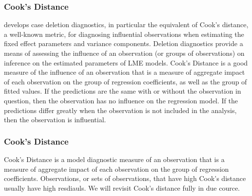 \documentclass[12pt, a4paper]{report}
\theoremstyle{plain}
\theoremstyle{definition}
\theoremstyle{remark}
\begin{document}
	
	
	
	
	

	\subsubsection{Cook's Distance}
	\citet{Christensen} develops  case deletion diagnostics, in particular the equivalent of  Cook's distance, a well-known metric, for diagnosing influential observations when estimating the fixed effect parameters and variance components. Deletion diagnostics provide a means of assessing the influence of an observation (or groups of observations) on inference on the estimated parameters of LME models. 
	Cook's Distance is a good measure of the influence of an observation that is a measure of aggregate impact of each observation on the group of regression coefficients, as well as the group of fitted values.
	If the predictions are the same with or without the observation in question, then the observation has no influence on the regression model. If the predictions differ greatly when the observation is not included in the analysis, then the observation is influential.
	
	
	
	
	
	\subsubsection{Cook's Distance}%
	
		Cook's Distance is a model diagnostic measure of an observation that is a measure of aggregate impact of each observation on the group of regression coefficients. Observations, or sets of observations, that have high Cook's distance usually have high resdiauls. We will revisit Cook's distance fully in due cource.
		
\end{document}
